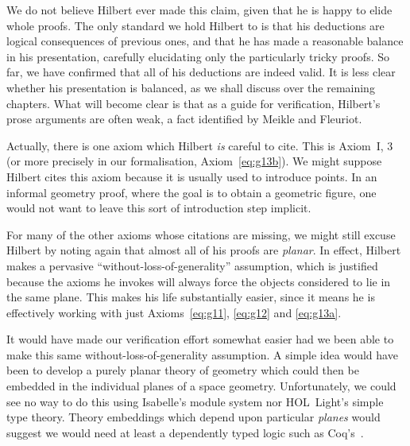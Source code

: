 We do not believe Hilbert ever made this claim, given that he is happy to elide whole proofs. The only standard we hold Hilbert to is that his deductions are logical consequences of previous ones, and that he has made a reasonable balance in his presentation, carefully elucidating only the particularly tricky proofs. So far, we have confirmed that all of his deductions are indeed valid. It is less clear whether his presentation is balanced, as we shall discuss over the remaining chapters. What will become clear is that as a guide for verification, Hilbert's prose arguments are often weak, a fact identified by Meikle and Fleuriot. 

Actually, there is one axiom which Hilbert \emph{is} careful to cite. This is Axiom~I, 3 (or more precisely in our formalisation, Axiom~\ref{eq:g13b}). We might suppose Hilbert cites this axiom because it is usually used to introduce points. In an informal geometry proof, where the goal is to obtain a geometric figure, one would not want to leave this sort of introduction step implicit.

\label{sec:PlanarProofs}For many of the other axioms whose citations are missing, we might still excuse Hilbert by noting again that almost all of his proofs are \emph{planar}. In effect, Hilbert makes a pervasive ``without-loss-of-generality'' assumption, which is justified because the axioms he invokes will always force the objects considered to lie in the same plane. This makes his life substantially easier, since it means he is effectively working with just Axioms~\ref{eq:g11}, \ref{eq:g12} and \ref{eq:g13a}.

It would have made our verification effort somewhat easier had we been able to make this same without-loss-of-generality assumption. A simple idea would have been to develop a purely planar theory of geometry which could then be embedded in the individual planes of a space geometry. Unfortunately, we could see no way to do this using Isabelle's module system nor HOL~Light's simple type theory. Theory embeddings which depend upon particular \emph{planes} would suggest we would need at least a dependently typed logic such as Coq's~\cite{Coq}.


